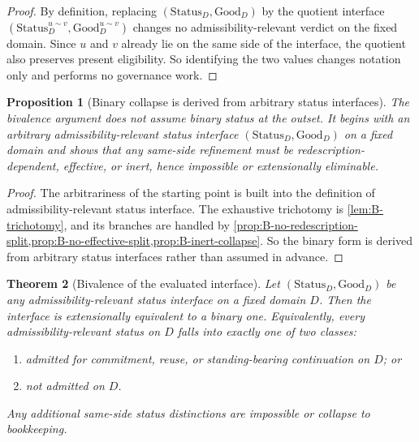 \documentclass[11pt]{article}
\theoremstyle{plain}
\newtheorem{theorem}{Theorem}[section]
\newtheorem{proposition}[theorem]{Proposition}
\theoremstyle{definition}
\newcommand{\domain}{D}
\newcommand{\Good}{\mathrm{Good}}
\begin{document}
\begin{proof}
By definition, replacing $(\mathrm{Status}_\domain,\Good_\domain)$ by the quotient interface $(\mathrm{Status}^{u\sim v}_\domain,\Good^{u\sim v}_\domain)$ changes no admissibility-relevant verdict on the fixed domain. Since $u$ and $v$ already lie on the same side of the interface, the quotient also preserves present eligibility. So identifying the two values changes notation only and performs no governance work.
\end{proof}

\begin{proposition}[Binary collapse is derived from arbitrary status interfaces]
\label{prop:B-binary-derived}
The bivalence argument does not assume binary status at the outset. It begins with an arbitrary admissibility-relevant status interface $(\mathrm{Status}_\domain,\Good_\domain)$ on a fixed domain and shows that any same-side refinement must be redescription-dependent, effective, or inert, hence impossible or extensionally eliminable.
\end{proposition}

\begin{proof}
The arbitrariness of the starting point is built into the definition of admissibility-relevant status interface. The exhaustive trichotomy is \cref{lem:B-trichotomy}, and its branches are handled by \cref{prop:B-no-redescription-split,prop:B-no-effective-split,prop:B-inert-collapse}. So the binary form is derived from arbitrary status interfaces rather than assumed in advance.
\end{proof}

\begin{theorem}[Bivalence of the evaluated interface]
\label{thm:B-bivalence}
Let $(\mathrm{Status}_\domain,\Good_\domain)$ be any admissibility-relevant status interface on a fixed domain $\domain$. Then the interface is extensionally equivalent to a binary one. Equivalently, every admissibility-relevant status on $\domain$ falls into exactly one of two classes:
\begin{enumerate}[label=(\roman*), leftmargin=2.5em]
    \item admitted for commitment, reuse, or standing-bearing continuation on $\domain$; or
    \item not admitted on $\domain$.
\end{enumerate}
Any additional same-side status distinctions are impossible or collapse to bookkeeping.
\end{theorem}
\end{document}

